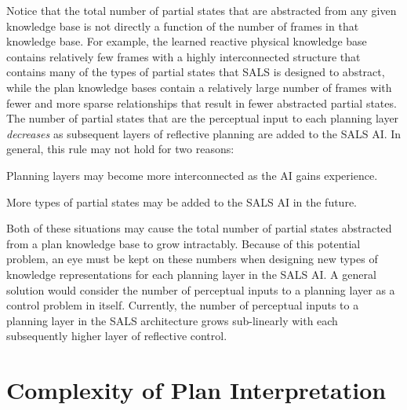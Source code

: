 Notice that the total number of partial states that are abstracted
from any given knowledge base is not directly a function of the number
of frames in that knowledge base.  For example, the learned reactive
physical knowledge base contains relatively few frames with a highly
interconnected structure that contains many of the types of partial
states that SALS is designed to abstract, while the plan knowledge
bases contain a relatively large number of frames with fewer and more
sparse relationships that result in fewer abstracted partial states.
The number of partial states that are the perceptual input to each
planning layer \emph{decreases} as subsequent layers of reflective
planning are added to the SALS AI.  In general, this rule may not hold
for two reasons:
\begin{packed_enumerate}
\item{Planning layers may become more interconnected as the AI gains
  experience.}
\item{More types of partial states may be added to the SALS AI in the
  future.}
\end{packed_enumerate}
Both of these situations may cause the total number of partial states
abstracted from a plan knowledge base to grow intractably.  Because of
this potential problem, an eye must be kept on these numbers when
designing new types of knowledge representations for each planning
layer in the SALS AI.  A general solution would consider the number of
perceptual inputs to a planning layer as a control problem in itself.
Currently, the number of perceptual inputs to a planning layer in the
SALS architecture grows sub-linearly with each subsequently higher
layer of reflective control.

\section{Complexity of Plan Interpretation}

